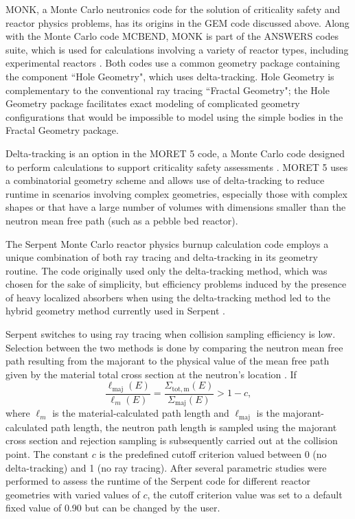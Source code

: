 MONK, a Monte Carlo neutronics code for the solution of criticality safety and reactor physics problems,
has its origins in the GEM code discussed above. Along with the Monte Carlo code MCBEND, MONK is part of
the ANSWERS codes suite, which is used for calculations involving a variety of reactor types, including
experimental reactors \cite{mcbend}. Both codes use a common geometry package containing the component
``Hole Geometry", which uses delta-tracking. Hole Geometry is complementary to the conventional ray 
tracing ``Fractal Geometry"; the Hole Geometry package facilitates exact modeling of complicated geometry
configurations that would be impossible to model using the simple bodies in the Fractal Geometry package.

Delta-tracking is an option in the MORET 5 code, a Monte Carlo code designed to perform calculations to
support criticality safety assessments \cite{moret}. MORET 5 uses a combinatorial geometry scheme and
allows use of delta-tracking to reduce runtime in scenarios involving complex geometries, especially those
with complex shapes or that have a large number of volumes with dimensions smaller than the neutron mean
free path (such as a pebble bed reactor).

The Serpent Monte Carlo reactor physics burnup calculation code employs a unique combination of both ray
tracing and delta-tracking in its geometry routine. The code originally used only the delta-tracking 
method, which was chosen for the sake of simplicity, but efficiency problems induced by the presence of 
heavy localized absorbers when using the delta-tracking method led to the hybrid geometry method currently
used in Serpent \cite{serp_thesis}.

Serpent switches to using ray tracing when collision sampling efficiency is low. Selection between the two
methods is done by comparing the neutron mean free path resulting from the majorant to the physical value 
of the mean free path given by the material total cross section at the neutron's location 
\cite{serp_delta}. If
%
\begin{equation}
\label{deltaray}
\frac{\ell_{\mathrm{maj}}(E)}{\ell_m(E)}=\frac{\Sigma_{\mathrm{tot,m}}(E)}{\Sigma_{\mathrm{maj}}(E)}>1-c,
\end{equation}
%
where $\ell_m$ is the material-calculated path length and $\ell_{\mathrm{maj}}$ is the majorant-calculated
path length, the neutron path length is sampled using the majorant cross section and rejection sampling is
subsequently carried out at the collision point. The constant $c$ is the predefined cutoff criterion 
valued between 0 (no delta-tracking) and 1 (no ray tracing). After several parametric studies were 
performed to assess the runtime of the Serpent code for different reactor geometries with varied values of
$c$, the cutoff criterion value was set to a default fixed value of 0.90 \cite{serp_delta} but can be 
changed by the user.

